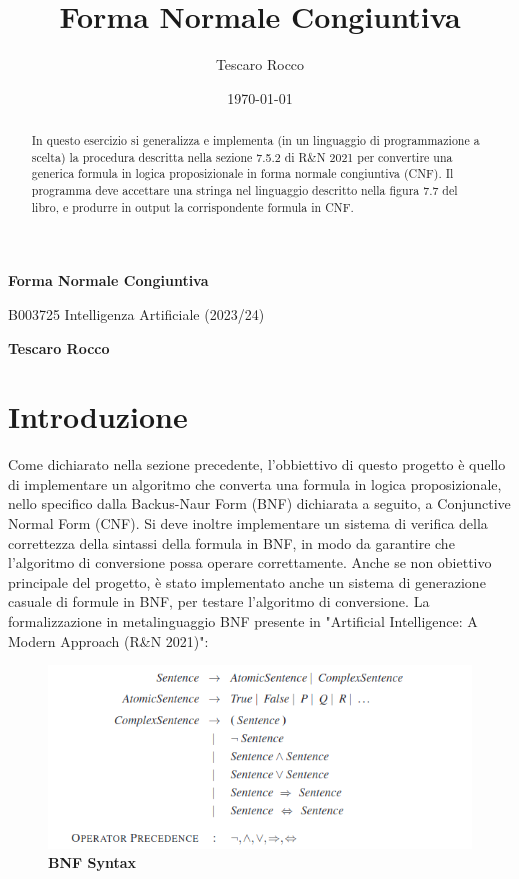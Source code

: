 \documentclass{article} %
\title{Forma Normale Congiuntiva}
\author{Tescaro Rocco}
\date{\today}
\begin{document}
\thispagestyle{plain}
\begin{center}
    \Large
    \textbf{Forma Normale Congiuntiva}
    
    \vspace{0.2cm}
    \large
    B003725 Intelligenza Artificiale (2023/24)
    
    \vspace{0.4cm}
    \textbf{Tescaro Rocco}
    \vspace{0.2cm}
\end{center}

\begin{abstract}
    
In questo esercizio si generalizza e implementa (in un linguaggio di programmazione a scelta) la procedura descritta nella sezione 7.5.2 di R\&N 2021 per convertire una generica formula in logica proposizionale in forma normale congiuntiva (CNF). Il programma deve accettare una stringa nel linguaggio descritto nella figura 7.7 del libro, e produrre in output la corrispondente formula in CNF.

\end{abstract}

\section*{Introduzione} 

Come dichiarato nella sezione precedente, l'obbiettivo di questo progetto è quello di implementare un algoritmo che converta una formula in logica proposizionale, nello specifico dalla Backus-Naur Form (BNF) dichiarata a seguito, a Conjunctive Normal Form (CNF).
Si deve inoltre implementare un sistema di verifica della correttezza della sintassi della formula in BNF, in modo da garantire che l'algoritmo di conversione possa operare correttamente. Anche se non obiettivo principale del progetto, è stato implementato anche un sistema di generazione casuale di formule in BNF, per testare l'algoritmo di conversione.
La formalizzazione in metalinguaggio BNF presente in "Artificial Intelligence: A Modern Approach (R\&N 2021)":

\begin{figure}[htbp]
    \caption{\textbf{BNF Syntax}}
    \centering
    \includegraphics[width=\linewidth]{bnf}
\end{figure}
\end{document}
